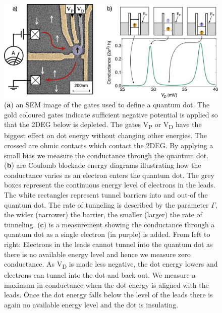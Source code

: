 \begin{figure}[!htb]
  \begin{center}
    \includegraphics[width=1.0\textwidth]{figures/ch1/crop_PosterFiguresMaster.003.png}
    \caption[Conductance through a quantum dot]{\label{fig:ch1/dot_intro} 
    (\textbf{a}) an SEM image of the gates used to define a quantum dot. The gold coloured gates indicate sufficient negative potential is applied so that the 2DEG below is depleted. The gates V\textsubscript{P} or V\textsubscript{D} have the biggest effect on dot energy without changing other energies. The crossed are ohmic contacts which contact the 2DEG. By applying a small bias we measure the conductance through the quantum dot. (\textbf{b}) are Coulomb blockade energy diagrams illustrating how the conductance varies as an electron enters the quantum dot. The grey boxes represent the continuous energy level of electrons in the leads. The white rectangles represent tunnel barriers into and out-of the quantum dot. The rate of tunneling is described by the parameter $\Gamma$, the wider (narrower) the barrier, the smaller (larger) the rate of tunneling. (\textbf{c}) is a measurement showing the conductance through a quantum dot as a single electron (in purple) is added. From left to right: Electrons in the leads cannot tunnel into the quantum dot as there is no available energy level and hence we measure zero conductance. As V\textsubscript{D} is made less negative, the dot energy lowers and electrons can tunnel into the dot and back out. We measure a maximum in conductance when the dot energy is aligned with the leads. Once the dot energy falls below the level of the leads there is again no available energy level and the dot is insulating. 
      }
  \end{center}
\end{figure}

